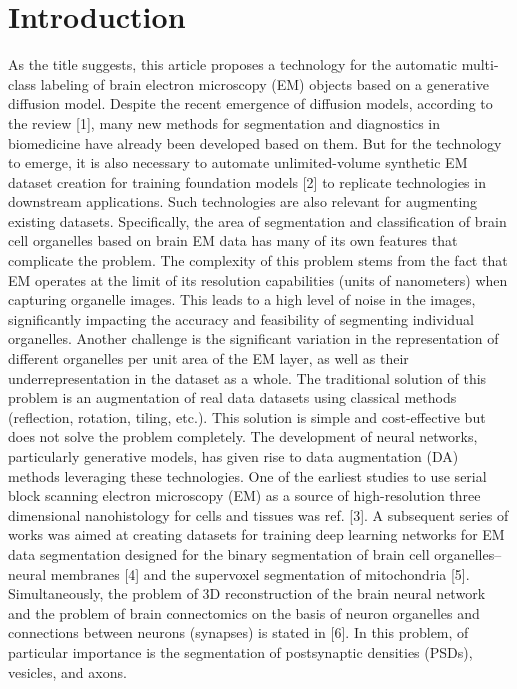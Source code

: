 \documentclass[journal,article,submit,pdftex,moreauthors]{Definitions/mdpi}
\begin{document}
\section{Introduction}

As the title suggests, this article proposes a technology for the automatic multi-class labeling of brain electron microscopy (EM) objects based on a generative diffusion model. Despite the recent emergence of diffusion models, according to the review [1], many new methods for segmentation and diagnostics in biomedicine have already been developed based on them. But for the technology to emerge, it is also necessary to automate unlimited-volume synthetic EM dataset creation for training foundation models [2] to replicate technologies in downstream applications. Such technologies are also relevant for augmenting existing datasets. Specifically, the area of segmentation and classification of brain cell organelles based on brain EM data has many of its own features that complicate the problem. The complexity of this problem stems from the fact that EM operates at the limit of its resolution capabilities (units of nanometers) when capturing organelle images. This leads to a high level of noise in the images, significantly impacting the accuracy and feasibility of segmenting individual organelles. Another challenge is the significant variation in the representation of different organelles per unit area of the EM layer, as well as their underrepresentation in the dataset as a whole. The traditional solution of this problem is an augmentation of real data datasets using classical methods (reflection, rotation, tiling, etc.). This solution is simple and cost-effective but does not solve the problem completely. The development of neural networks, particularly generative models, has given rise to data augmentation (DA) methods leveraging these technologies. One of the earliest studies to use serial block scanning electron microscopy (EM) as a source of high-resolution three dimensional nanohistology for cells and tissues was ref. [3]. A subsequent series of works was aimed at creating datasets for training deep learning networks for EM data segmentation designed for the binary segmentation of brain cell organelles–neural membranes [4] and the supervoxel segmentation of mitochondria [5]. Simultaneously, the problem of 3D reconstruction of the brain neural network and the problem of brain connectomics on the basis of neuron organelles and connections between neurons (synapses) is stated in [6]. In this problem, of particular importance is the segmentation of postsynaptic densities (PSDs), vesicles, and axons.
\end{document}
